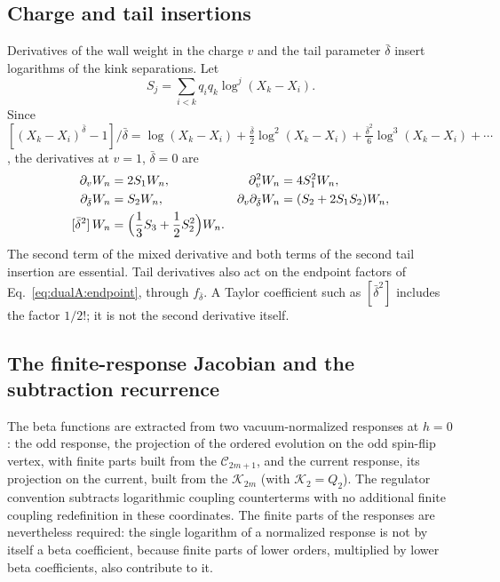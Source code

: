 \documentclass[11pt,a4paper]{article}
\numberwithin{equation}{section}
\newcommand{\db}{\bar\delta}
\begin{document}
\subsection{Charge and tail insertions}\label{app:dualA:insertions}
Derivatives of the wall weight in the charge $v$ and the tail parameter $\db$ insert logarithms of the kink
separations. Let
\begin{equation}
 S_j=\sum_{i<k}q_iq_k\log^j(X_k-X_i).
\end{equation}
Since $[(X_k-X_i)^{\db}-1]/\db=\log(X_k-X_i)+\frac{\db}2\log^2(X_k-X_i)+\frac{\db^2}6\log^3(X_k-X_i)+\cdots$, the
derivatives at $v=1$, $\db=0$ are
\begin{equation}
\begin{aligned}
 \partial_vW_n&=2S_1W_n,&\partial_v^2W_n&=4S_1^2W_n,\\
 \partial_{\db}W_n&=S_2W_n,&\partial_v\partial_{\db}W_n&=(S_2+2S_1S_2)W_n,\\
 [\db^2]\,W_n&=\Bigl(\frac13S_3+\frac12S_2^2\Bigr)W_n.
\end{aligned}
\label{eq:dualA:insertions}
\end{equation}
The second term of the mixed derivative and both terms of the second tail insertion are essential. Tail derivatives
also act on the endpoint factors of Eq.~\eqref{eq:dualA:endpoint}, through $f_{\db}$. A Taylor coefficient such as
$[\db^2]$ includes the factor $1/2!$; it is not the second derivative itself.

\subsection{The finite-response Jacobian and the subtraction recurrence}\label{app:dualA:recurrence}
The beta functions are extracted from two vacuum-normalized responses at $h=0$: the odd response, the projection of
the ordered evolution on the odd spin-flip vertex, with finite parts built from the $\mathcal C_{2m+1}$, and the
current response, its projection on the current, built from the $\mathcal K_{2m}$ (with $\mathcal K_2=Q_2$). The
regulator convention subtracts logarithmic coupling counterterms with no additional finite coupling redefinition in
these coordinates. The finite parts of the responses are nevertheless required: the single logarithm of a normalized
response is not by itself a beta coefficient, because finite parts of lower orders, multiplied by lower beta
coefficients, also contribute to it.
\end{document}
